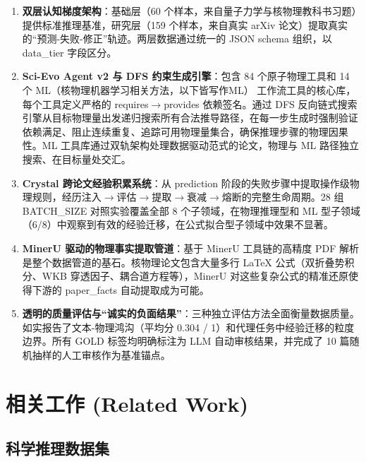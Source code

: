 \documentclass[12pt,a4paper]{article}
\begin{document}
\begin{enumerate}
\item \textbf{双层认知梯度架构}：基础层（60 个样本，来自量子力学与核物理教科书习题）提供标准推理基准，研究层（159 个样本，来自真实 arXiv 论文）提取真实的“预测-失败-修正”轨迹。两层数据通过统一的 JSON schema 组织，以 data\_tier 字段区分。

\item \textbf{Sci-Evo Agent v2 与 DFS 约束生成引擎}：包含 84 个原子物理工具和 14 个 ML（核物理机器学习相关方法，以下皆写作ML） 工作流工具的核心库，每个工具定义严格的 requires$\rightarrow$provides 依赖签名。通过 DFS 反向链式搜索引擎从目标物理量出发递归搜索所有合法推导路径，在每一步生成时强制验证依赖满足、阻止连续重复、追踪可用物理量集合，确保推理步骤的物理因果性。ML 工具库通过双轨架构处理数据驱动范式的论文，物理与 ML 路径独立搜索、在目标量处交汇。

\item \textbf{Crystal 跨论文经验积累系统}：从 prediction 阶段的失败步骤中提取操作级物理规则，经历注入$\rightarrow$评估$\rightarrow$提取$\rightarrow$衰减$\rightarrow$熔断的完整生命周期。28 组 BATCH\_SIZE 对照实验覆盖全部 8 个子领域，在物理推理型和 ML 型子领域（6/8）中观察到有效的经验迁移，在公式拟合型子领域中效果不显著。

\item \textbf{MinerU 驱动的物理事实提取管道}：基于 MinerU 工具链的高精度 PDF 解析是整个数据管道的基石。核物理论文包含大量多行 LaTeX 公式（双折叠势积分、WKB 穿透因子、耦合道方程等），MinerU 对这些复杂公式的精准还原使得下游的 paper\_facts 自动提取成为可能。

\item \textbf{透明的质量评估与“诚实的负面结果”}：三种独立评估方法全面衡量数据质量。如实报告了文本-物理鸿沟（平均分 0.304 / 1）和代理任务中经验迁移的粒度边界。所有 GOLD 标签均明确标注为 LLM 自动审核结果，并完成了 10 篇随机抽样的人工审核作为基准锚点。
\end{enumerate}

\section{相关工作 (Related Work)}

\subsection{科学推理数据集}
\end{document}
